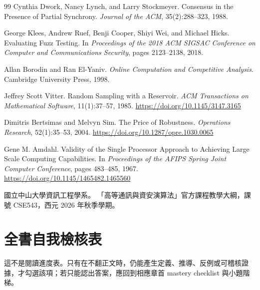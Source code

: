 \documentclass[11pt,a4paper,oneside,openany]{book}
\begin{document}
\begin{thebibliography}{99}
Cynthia Dwork, Nancy Lynch, and Larry Stockmeyer.
\newblock Consensus in the Presence of Partial Synchrony.
\newblock \emph{Journal of the ACM}, 35(2):288--323, 1988.

George Klees, Andrew Ruef, Benji Cooper, Shiyi Wei, and Michael Hicks.
\newblock Evaluating Fuzz Testing.
\newblock In \emph{Proceedings of the 2018 ACM SIGSAC Conference on Computer and Communications Security}, pages 2123--2138, 2018.

Allan Borodin and Ran El-Yaniv.
\newblock \emph{Online Computation and Competitive Analysis}.
\newblock Cambridge University Press, 1998.

Jeffrey Scott Vitter.
\newblock Random Sampling with a Reservoir.
\newblock \emph{ACM Transactions on Mathematical Software}, 11(1):37--57, 1985.
\newblock \url{https://doi.org/10.1145/3147.3165}

Dimitris Bertsimas and Melvyn Sim.
\newblock The Price of Robustness.
\newblock \emph{Operations Research}, 52(1):35--53, 2004.
\newblock \url{https://doi.org/10.1287/opre.1030.0065}

Gene M. Amdahl.
\newblock Validity of the Single Processor Approach to Achieving Large Scale Computing Capabilities.
\newblock In \emph{Proceedings of the AFIPS Spring Joint Computer Conference}, pages 483--485, 1967.
\newblock \url{https://doi.org/10.1145/1465482.1465560}

國立中山大學資訊工程學系。
\newblock 「高等通訊與資安演算法」官方課程教學大綱，課號 CSE543，西元 2026 年秋季學期。
\end{thebibliography}

\chapter*{全書自我檢核表}
這不是閱讀進度表。只有在不翻正文時，仍能產生定義、推導、反例或可稽核證據，才勾選該項；若只能認出答案，應回到相應章首 mastery checklist 與小題階梯。
\end{document}
